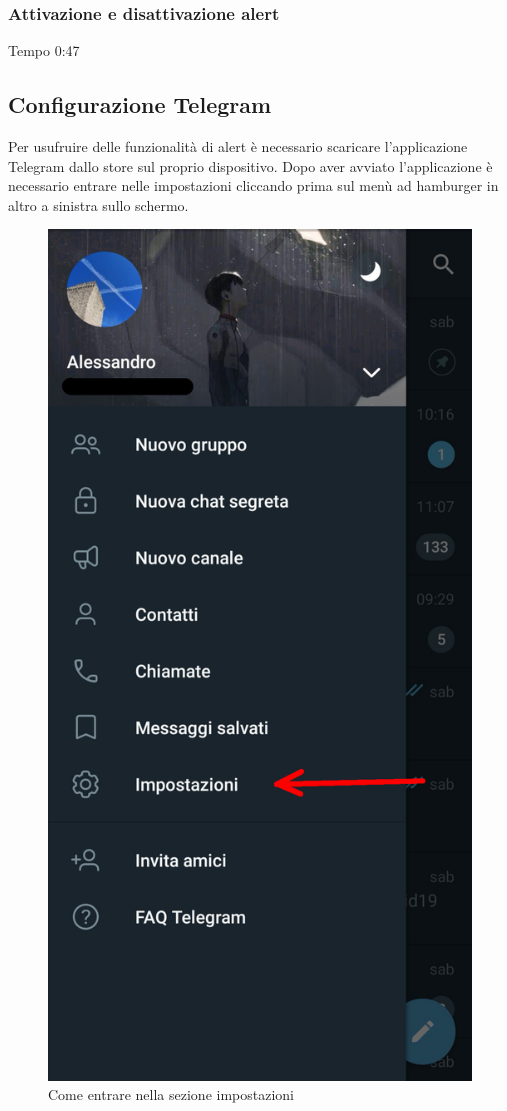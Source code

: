 	\subsubsection{Attivazione e disattivazione alert}
	Tempo 0:47

\subsection{Configurazione Telegram}
	Per usufruire delle funzionalità di alert è necessario scaricare l'applicazione Telegram dallo store sul proprio dispositivo.
	Dopo aver avviato l'applicazione è necessario entrare nelle impostazioni cliccando prima sul menù ad hamburger in altro a sinistra sullo schermo.
	\begin{figure}[H]
		\centering
		\includegraphics[scale=0.100]{res/images/telegram1.jpg}
		\caption{Come entrare nella sezione impostazioni}
		\label{Screenshot1}
	\end{figure}
